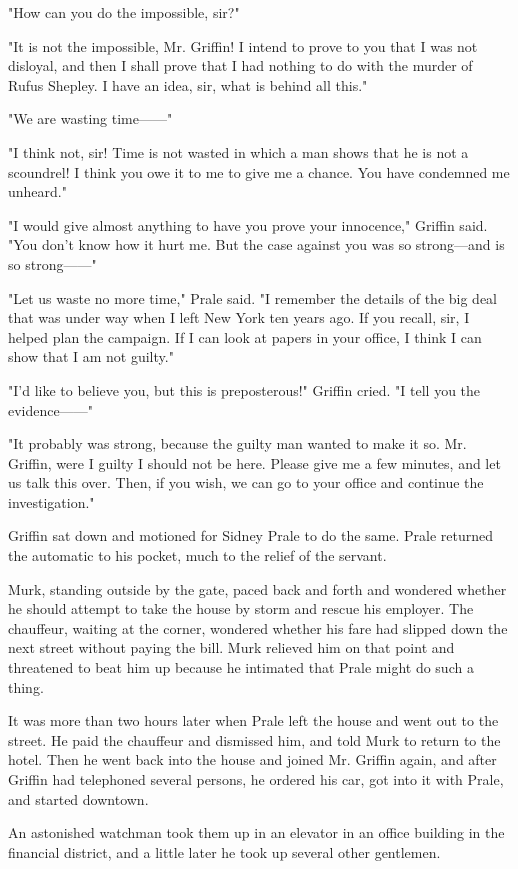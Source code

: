 \documentclass{novel}
\begin{document}
"How can you do the impossible, sir?"

"It is not the impossible, Mr. Griffin! I intend to prove to you that I was not disloyal, and then I shall prove that I had nothing to do with the murder of Rufus Shepley. I have an idea, sir, what is behind all this."

"We are wasting time------"

"I think not, sir! Time is not wasted in which a man shows that he is not a scoundrel! I think you owe it to me to give me a chance. You have condemned me unheard."

"I would give almost anything to have you prove your innocence," Griffin said. "You don't know how it hurt me. But the case against you was so strong---and is so strong------"

"Let us waste no more time," Prale said. "I remember the details of the big deal that was under way when I left New York ten years ago. If you recall, sir, I helped plan the campaign. If I can look at papers in your office, I think I can show that I am not guilty."

"I'd like to believe you, but this is preposterous!" Griffin cried. "I tell you the evidence------"

"It probably was strong, because the guilty man wanted to make it so. Mr. Griffin, were I guilty I should not be here. Please give me a few minutes, and let us talk this over. Then, if you wish, we can go to your office and continue the investigation."

Griffin sat down and motioned for Sidney Prale to do the same. Prale returned the automatic to his pocket, much to the relief of the servant.

Murk, standing outside by the gate, paced back and forth and wondered whether he should attempt to take the house by storm and rescue his employer. The chauffeur, waiting at the corner, wondered whether his fare had slipped down the next street without paying the bill. Murk relieved him on that point and threatened to beat him up because he intimated that Prale might do such a thing.

It was more than two hours later when Prale left the house and went out to the street. He paid the chauffeur and dismissed him, and told Murk to return to the hotel. Then he went back into the house and joined Mr. Griffin again, and after Griffin had telephoned several persons, he ordered his car, got into it with Prale, and started downtown.

An astonished watchman took them up in an elevator in an office building in the financial district, and a little later he took up several other gentlemen.
\end{document}
